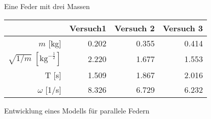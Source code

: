 \documentclass{alex_gp}
\begin{document}
\renewcommand{\labelenumi}{\alph{enumi})}


\begin{mybox}{Eine Feder mit drei Massen}
	\begin{vwcol}[widths={0.6, 0.4}, sep=.8cm, justify=flush,rule=0pt, indent=1em, lines=20] 
		\begin{minipage}[t][0cm][t]{0.6\textwidth}
			\begin{tabular}{@{}r rrr @{}}\toprule
				& Versuch1 & Versuch 2 & Versuch 3 \\ \midrule
				\( m \) [kg] & 0.202 & 0.355 & 0.414 \\
				\( \sqrt{1/m}\; [\text{kg}^{-\tfrac{1}{2}}] \) & 2.220 & 1.677 & 1.553 \\
				T [s] & 1.509 & 1.867 & 2.016 \\
				$\omega$ [1/s] & 8.326 & 6.729 & 6.232 \\
				\bottomrule
			\end{tabular}
			\label{table:1}
		\end{minipage}%
		\newpage
		\lipsum[2]
	\end{vwcol}
	
\end{mybox}

\begin{mybox}{Entwicklung eines Modells für parallele Federn}

\end{mybox}

\begin{mybox}{}

\end{mybox}
\end{document}

